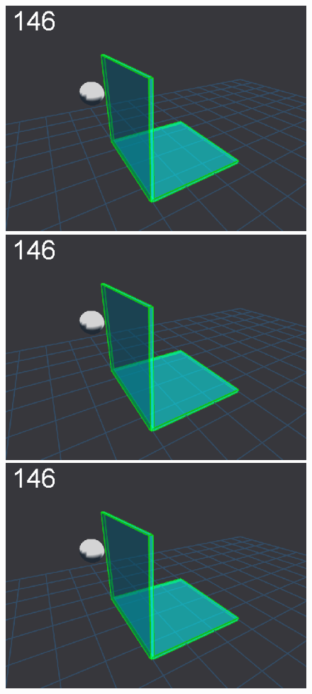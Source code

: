 \newlength{\imgBXwid}
\setlength{\imgBXwid}{2.2cm}
\begin{figure}[tb]
\centerline{
\includegraphics[width=\imgBXwid]{images/B1_1exp_20_1}
\includegraphics[width=\imgBXwid]{images/B1_2exp_20_1}
\includegraphics[width=\imgBXwid]{images/B1_3exp_20_1}
}
\end{figure}
